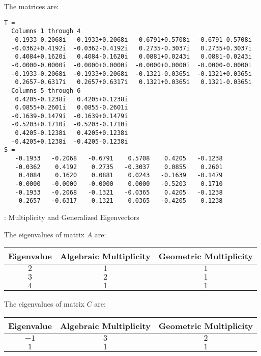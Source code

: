 \ans The matrices are:
\begin{verbatim}
T =
  Columns 1 through 4 
  -0.1933-0.2068i  -0.1933+0.2068i  -0.6791+0.5708i  -0.6791-0.5708i
  -0.0362+0.4192i  -0.0362-0.4192i   0.2735-0.3037i   0.2735+0.3037i
   0.4084+0.1620i   0.4084-0.1620i   0.0881+0.0243i   0.0881-0.0243i
  -0.0000-0.0000i  -0.0000+0.0000i  -0.0000+0.0000i  -0.0000-0.0000i
  -0.1933-0.2068i  -0.1933+0.2068i  -0.1321-0.0365i  -0.1321+0.0365i
   0.2657-0.6317i   0.2657+0.6317i   0.1321+0.0365i   0.1321-0.0365i
  Columns 5 through 6 
   0.4205-0.1238i   0.4205+0.1238i
   0.0855+0.2601i   0.0855-0.2601i
  -0.1639-0.1479i  -0.1639+0.1479i
  -0.5203+0.1710i  -0.5203-0.1710i
   0.4205-0.1238i   0.4205+0.1238i
  -0.4205+0.1238i  -0.4205-0.1238i
S =
   -0.1933   -0.2068   -0.6791    0.5708    0.4205   -0.1238
   -0.0362    0.4192    0.2735   -0.3037    0.0855    0.2601
    0.4084    0.1620    0.0881    0.0243   -0.1639   -0.1479
   -0.0000   -0.0000   -0.0000    0.0000   -0.5203    0.1710
   -0.1933   -0.2068   -0.1321   -0.0365    0.4205   -0.1238
    0.2657   -0.6317    0.1321    0.0365   -0.4205    0.1238
\end{verbatim}





: Multiplicity and Generalized Eigenvectors

 The eigenvalues of matrix $A$ are:
\begin{center}
\begin{tabular}{|c|c|c|}
\hline
Eigenvalue & Algebraic Multiplicity & Geometric Multiplicity \\
\hline
$2$ & $1$ & $1$ \\
$3$ & $2$ & $1$ \\
$4$ & $1$ & $1$ \\
\hline
\end{tabular}
\end{center}

 The eigenvalues of matrix $C$ are:
\begin{center}
\begin{tabular}{|c|c|c|}
\hline
Eigenvalue & Algebraic Multiplicity & Geometric Multiplicity \\
\hline
$-1$ & $3$ & $2$ \\
$1$ & $1$ & $1$ \\
\hline
\end{tabular}
\end{center}

